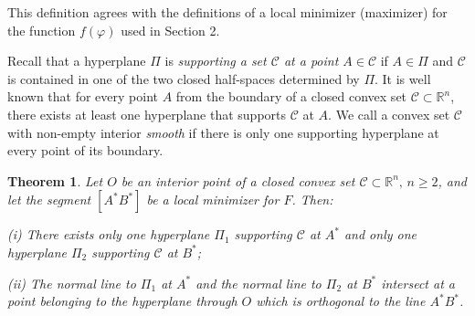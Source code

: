 \documentclass[a4paper,12pt]{amsart}
\newtheorem{thm}{Theorem}
\begin{document}
This definition agrees with the definitions of a local
minimizer (maximizer) for the function $f(\varphi)$ used in Section 2.
\smallskip


 Recall that a hyperplane $\Pi$ is \emph{supporting a set $\mathcal C$ at a point  $A \in \mathcal C$} if $A \in\Pi$ and $\mathcal C$
 is contained in one of the two closed half-spaces determined by $\Pi$.
 It is well known that for every point $A$ from the boundary of a closed convex set $\mathcal C \subset \mathbb{R}^n$,
 there exists at least one hyperplane that supports $\mathcal C$ at $A$. We call a convex set $\mathcal C$ with non-empty
 interior {\it smooth} if there is only one supporting hyperplane at every point of its boundary.

\begin{thm} \label{thmmin}
Let $O$ be an interior point of a closed convex set $\mathcal C
\subset \mathbb{R}^n,\, n \geq 2$, and let the segment $[A^*B^*]$
be a local minimizer for $F$. Then:

(i) There exists only one hyperplane $\Pi_1$   supporting $\mathcal C$   at  $A^*$ and only one hyperplane $\Pi_2$ supporting $\mathcal C$  at $B^*$;

(ii) The normal line to $\Pi_1$ at $A^*$ and the normal line to
$\Pi_2$ at $B^*$ intersect at a point belonging to the hyperplane
through $O$ which is orthogonal to the line $A^*B^*$.
\end{thm}
\end{document}
